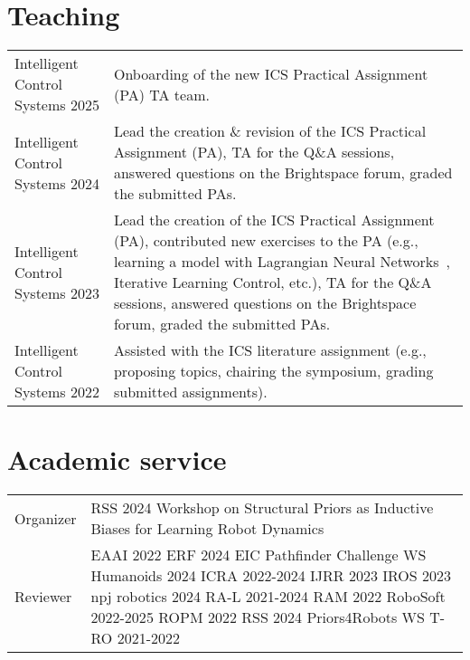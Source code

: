 \section*{Teaching}
\noindent
\begin{longtable}{p{} p{}}
    Intelligent Control \newline Systems 2025 & Onboarding of the new ICS Practical Assignment (PA) TA team.\\
    Intelligent Control \newline Systems 2024 & Lead the creation \& revision of the ICS Practical Assignment (PA), TA for the Q\&A sessions, answered questions on the Brightspace forum, graded the submitted PAs.\\
    Intelligent Control \newline Systems 2023 & Lead the creation of the ICS Practical Assignment (PA), contributed new exercises to the PA (e.g., learning a model with Lagrangian Neural Networks~\citep{lutter2019deep}, Iterative Learning Control, etc.), TA for the Q\&A sessions, answered questions on the Brightspace forum, graded the submitted PAs.\\
    Intelligent Control \newline Systems 2022 & Assisted with the ICS literature assignment (e.g., proposing topics, chairing the symposium, grading submitted assignments).\\
\end{longtable}

\section*{Academic service}
\noindent
\begin{longtable}{p{} p{}}
    Organizer & RSS 2024 Workshop on Structural Priors as Inductive Biases for Learning Robot Dynamics\\
    Reviewer & 
        EAAI 2022 \newline
        ERF 2024 EIC Pathfinder Challenge WS \newline
        Humanoids 2024 \newline
        ICRA 2022-2024 \newline 
        IJRR 2023 \newline
        IROS 2023 \newline
        npj robotics 2024 \newline
        RA-L 2021-2024 \newline
        RAM 2022 \newline
        RoboSoft 2022-2025 \newline
        ROPM 2022 \newline
        RSS 2024 Priors4Robots WS \newline
        T-RO 2021-2022
    \\
\end{longtable}